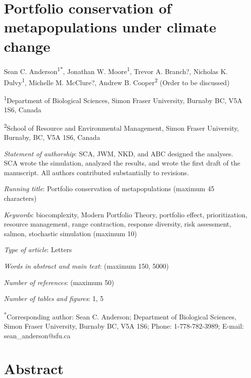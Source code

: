 \section{Portfolio conservation of metapopulations under climate change}

\setlength{\parskip}{6pt} \setlength{\parindent}{0cm}

Sean C. Anderson\textsuperscript{1*}, Jonathan W. Moore\textsuperscript{1}, Trevor A. Branch?, Nicholas K. Dulvy\textsuperscript{1}, Michelle M. McClure?, Andrew B. Cooper\textsuperscript{2} (Order to be discussed)

\textsuperscript{1}Department of Biological Sciences, Simon Fraser University, Burnaby BC, V5A 1S6, Canada

\textsuperscript{2}School of Resource and Environmental Management, Simon Fraser University, Burnaby, BC, V5A 1S6, Canada

\emph{Statement of authorship}: SCA, JWM, NKD, and ABC designed the analyses. SCA wrote the simulation, analyzed the results, and wrote the first draft of the manuscript. All authors contributed substantially to revisions.

\emph{Running title}: Portfolio conservation of metapopulations (maximum 45 characters)

\emph{Keywords}: biocomplexity, Modern Portfolio Theory, portfolio effect, prioritization, resource management, range contraction, response diversity, risk assessment, salmon, stochastic simulation (maximum 10)

\emph{Type of article}: Letters

\emph{Words in abstract and main text}: (maximum 150, 5000)

\emph{Number of references}: (maximum 50)

\emph{Number of tables and figures}: 1, 5

\textsuperscript{*}Corresponding author: Sean C. Anderson; Department of Biological Sciences, Simon Fraser University, Burnaby BC, V5A 1S6; Phone: 1-778-782-3989; E-mail: sean\_anderson@sfu.ca

\setlength{\parskip}{2pt} \setlength{\parindent}{16pt}

\section{Abstract}

